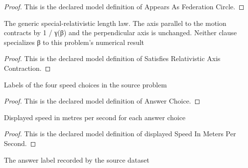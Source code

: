 \begin{proof}
  This is the declared model definition of Appears As Federation Circle.
\end{proof}
\begin{definition}
  \label{def:physics:phyx-mini-0608:phyxminiproblems-problemphyxmini0608-satisfiesrelativisticaxiscontraction}
  The generic special-relativistic length law. The axis parallel to the motion contracts by 1 / γ(β) and the perpendicular axis is unchanged. Neither clause specializes β to this problem's numerical result
\end{definition}
\begin{proof}
  This is the declared model definition of Satisfies Relativistic Axis Contraction.
\end{proof}
\begin{definition}
  \label{def:physics:phyx-mini-0608:phyxminiproblems-problemphyxmini0608-answerchoice}
  Labels of the four speed choices in the source problem
\end{definition}
\begin{proof}
  This is the declared model definition of Answer Choice.
\end{proof}
\begin{definition}
  \label{def:physics:phyx-mini-0608:phyxminiproblems-problemphyxmini0608-displayedspeedinmeterspersecond}
  Displayed speed in metres per second for each answer choice
\end{definition}
\begin{proof}
  This is the declared model definition of displayed Speed In Meters Per Second.
\end{proof}
\begin{definition}
  \label{def:physics:phyx-mini-0608:phyxminiproblems-problemphyxmini0608-recordeddatasetanswer}
  The answer label recorded by the source dataset
\end{definition}
